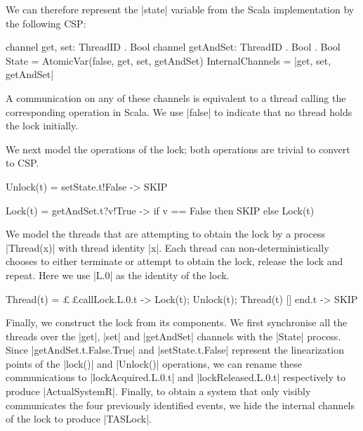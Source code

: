 We can therefore represent the |state| variable from the Scala implementation by the following CSP:
\begin{cspm}
  channel get, set: ThreadID . Bool
  channel getAndSet: ThreadID . Bool . Bool
  State = AtomicVar(false, get, set, getAndSet)
  InternalChannels = {|get, set, getAndSet|}
\end{cspm}
A communication on any of these channels is equivalent to a thread calling the corresponding operation in Scala. We use |false| to indicate that no thread holds the lock initially.

We next model the operations of the lock; both operations are trivial to convert to CSP.
\begin{cspm}
Unlock(t) = setState.t!False -> SKIP 

Lock(t) = getAndSet.t?v!True -> if v == False then SKIP 
                                  else Lock(t)
\end{cspm}



We model the threads that are attempting to obtain the lock by a process |Thread(x)| with thread identity |x|. Each thread can non-deterministically chooses to either terminate or attempt to obtain the lock, release the lock and repeat. %
Here we use |L.0| as the identity of the lock.

\begin{cspm}
Thread(t) =   £$\,$£callLock.L.0.t -> Lock(t); Unlock(t); Thread(t)
            [] end.t -> SKIP
\end{cspm}

Finally, we construct the lock from its components. We first synchronise all the threads over the |get|, |set| and |getAndSet| channels with the |State| process. Since \newline|getAndSet.t.False.True| and |setState.t.False| represent the linearization points of the |lock()| and |Unlock()| operations, we can rename these communications to |lockAcquired.L.0.t| and |lockReleased.L.0.t| respectively to produce |ActualSystemR|. Finally, to obtain a system that only visibly communicates the four previously identified events, we hide the internal channels of the lock to produce |TASLock|. %


